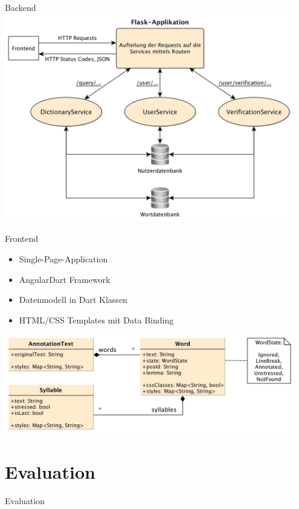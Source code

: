 \documentclass{beamer}
\begin{document}
\begin{frame}{Backend}
	\centering
	\includegraphics[width=0.95\textwidth]{../figures/backend}
\end{frame}

\begin{frame}{Frontend}
\begin{itemize}
	\item Single-Page-Application
	\item AngularDart Framework
	\item Datenmodell in Dart Klassen
	\item HTML/CSS Templates mit Data Binding
\end{itemize}
\centering
\includegraphics[width=0.95\textwidth]{../figures/frontend/uml-annotationtext}
\end{frame}

\section{Evaluation}
\begin{frame}
\centering
\huge{Evaluation}
\end{frame}
\end{document}

